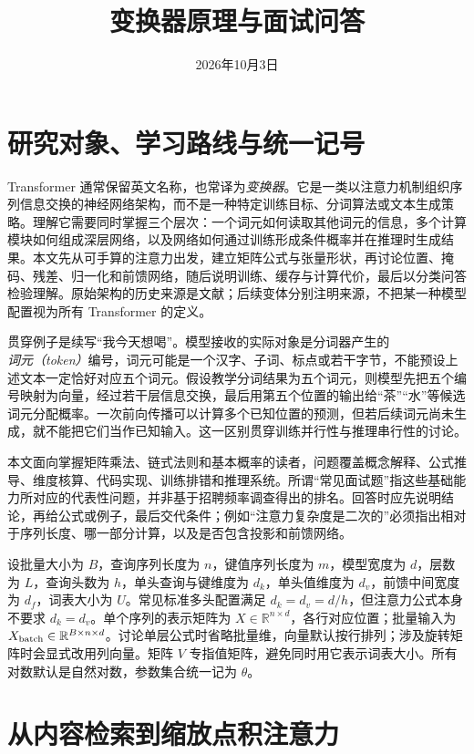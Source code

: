 \documentclass[UTF8,12pt,a4paper,fontset=fandol]{ctexart}
\title{变换器原理与面试问答}
\author{}
\date{2026年10月3日}
\begin{document}
\maketitle
\tableofcontents

\section{研究对象、学习路线与统一记号}
\label{sec:tr-intro}

Transformer 通常保留英文名称，也常译为\emph{变换器}。它是一类以注意力机制组织序列信息交换的神经网络架构，而不是一种特定训练目标、分词算法或文本生成策略。理解它需要同时掌握三个层次：一个词元如何读取其他词元的信息，多个计算模块如何组成深层网络，以及网络如何通过训练形成条件概率并在推理时生成结果。本文先从可手算的注意力出发，建立矩阵公式与张量形状，再讨论位置、掩码、残差、归一化和前馈网络，随后说明训练、缓存与计算代价，最后以分类问答检验理解。原始架构的历史来源是文献\cite{vaswani2017}；后续变体分别注明来源，不把某一种模型配置视为所有 Transformer 的定义。

贯穿例子是续写“我今天想喝”。模型接收的实际对象是分词器产生的\emph{词元（token）}编号，词元可能是一个汉字、子词、标点或若干字节，不能预设上述文本一定恰好对应五个词元。假设教学分词结果为五个词元，则模型先把五个编号映射为向量，经过若干层信息交换，最后用第五个位置的输出给“茶”“水”等候选词元分配概率。一次前向传播可以计算多个已知位置的预测，但若后续词元尚未生成，就不能把它们当作已知输入。这一区别贯穿训练并行性与推理串行性的讨论。

本文面向掌握矩阵乘法、链式法则和基本概率的读者，问题覆盖概念解释、公式推导、维度核算、代码实现、训练排错和推理系统。所谓“常见面试题”指这些基础能力所对应的代表性问题，并非基于招聘频率调查得出的排名。回答时应先说明结论，再给公式或例子，最后交代条件；例如“注意力复杂度是二次的”必须指出相对于序列长度、哪一部分计算，以及是否包含投影和前馈网络。

设批量大小为 $B$，查询序列长度为 $n$，键值序列长度为 $m$，模型宽度为 $d$，层数为 $L$，查询头数为 $h$，单头查询与键维度为 $d_k$，单头值维度为 $d_v$，前馈中间宽度为 $d_f$，词表大小为 $U$。常见标准多头配置满足 $d_k=d_v=d/h$，但注意力公式本身不要求 $d_k=d_v$。单个序列的表示矩阵为 $X\in\mathbb R^{n\times d}$，各行对应位置；批量输入为 $X_{\rm batch}\in\mathbb R^{B\times n\times d}$。讨论单层公式时省略批量维，向量默认按行排列；涉及旋转矩阵时会显式改用列向量。矩阵 $V$ 专指值矩阵，避免同时用它表示词表大小。所有对数默认是自然对数，参数集合统一记为 $\theta$。

\section{从内容检索到缩放点积注意力}
\label{sec:tr-attention}
\end{document}
